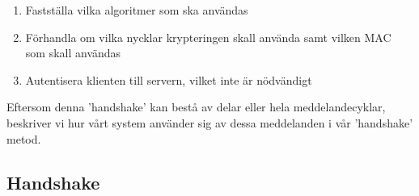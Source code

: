 \begin{enumerate}
\item{Fastställa vilka algoritmer som ska användas}
\item{Förhandla om vilka nycklar krypteringen skall använda samt vilken MAC som skall användas}
\item{Autentisera klienten till servern, vilket inte är nödvändigt}
\end{enumerate}

Eftersom denna 'handshake' kan bestå av delar eller hela meddelandecyklar, beskriver vi hur vårt system använder sig av dessa meddelanden i vår 'handshake' metod.

\subsection{Handshake}